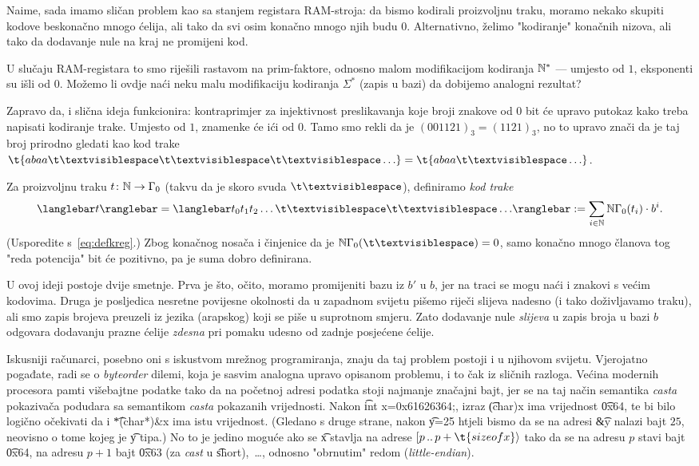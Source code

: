 Naime, sada imamo sličan problem kao sa stanjem registara RAM-stroja: da bismo kodirali proizvoljnu traku, moramo nekako skupiti kodove beskonačno mnogo ćelija, ali tako da svi osim konačno mnogo njih budu $0$. Alternativno, želimo "kodiranje" konačnih nizova, ali tako da dodavanje nule na kraj ne promijeni kod.

U slučaju RAM-registara to smo riješili rastavom na prim-faktore, odnosno malom modifikacijom kodiranja ${\mathbb N}^*$ --- umjesto od $1$, eksponenti su išli od $0$. Možemo li ovdje naći neku malu modifikaciju kodiranja $\Sigma^*$ (zapis u bazi) da dobijemo analogni rezultat?

Zapravo da, i slična ideja funkcionira: kontraprimjer za injektivnost preslikavanja koje broji znakove od $0$ bit će upravo putokaz kako treba napisati kodiranje trake. Umjesto od $1$, znamenke će ići od $0$. Tamo smo rekli da je $(001121)_3=(1121)_3$, no to upravo znači da je taj broj prirodno gledati kao kod trake $\t{abaa\bl\bl\bl\ldots}=\t{abaa\bl\ldots}$.

\begin{definicija}
Za proizvoljnu traku $t\colon{\mathbb N}\to\Gamma_0$ (takvu da je skoro svuda $\bl$), definiramo \emph{kod trake} \begin{equation}
    \knk{t}=\knk{t_0t_1t_2\ldots\bl\bl\ldots}:=\sum_{i\in\N}\N\Gamma_0(t_i)\cdot b^i\text.
\end{equation}
(Usporedite s~\eqref{eq:defkreg}.)
Zbog konačnog nosača i činjenice da je $\N\Gamma_0(\bl)=0$, samo konačno mnogo članova tog "reda potencija" bit će pozitivno, pa je suma dobro definirana.
\end{definicija}

U ovoj ideji postoje dvije smetnje. Prva je što, očito, moramo promijeniti bazu iz $b'$ u $b$, jer na traci se mogu naći i znakovi s većim kodovima. Druga je posljedica nesretne povijesne okolnosti da u zapadnom svijetu pišemo riječi slijeva nadesno (i tako doživljavamo traku), ali smo zapis brojeva preuzeli iz jezika (arapskog) koji se piše u suprotnom smjeru. Zato dodavanje nule \emph{slijeva} u zapis broja u bazi $b$ odgovara dodavanju prazne ćelije \emph{zdesna} pri pomaku udesno od zadnje posjećene ćelije.

Iskusniji računarci, posebno oni s iskustvom mrežnog programiranja, znaju da taj problem postoji i u njihovom svijetu. Vjerojatno pogađate, radi se o \emph{byteorder} dilemi, koja je sasvim analogna upravo opisanom problemu, i to čak iz sličnih razloga. Većina modernih procesora pamti višebajtne podatke tako da na početnoj adresi podatka stoji najmanje značajni bajt, jer se na taj način semantika \emph{casta} pokazivača podudara sa semantikom \emph{casta} pokazanih vrijednosti. Nakon \t{int x=0x61626364;}, izraz \t{(char)x} ima vrijednost \t{0x64}, te bi bilo logično očekivati da i \t{*(char*)\&x} ima istu vrijednost. (Gledano s druge strane, nakon \t{y=25} htjeli bismo da se na adresi \t{\&y} nalazi bajt $25$, neovisno o tome kojeg je \t y tipa.) No to je jedino moguće ako se \t x stavlja na adrese $[p\,..\,p+\t{sizeof x}\rangle$ tako da se na adresu $p$ stavi bajt \t{0x64}, na adresu $p+1$ bajt \t{0x63} (za \emph{cast} u \t{short}),~\ldots, odnosno "obrnutim" redom (\emph{little-endian}).

